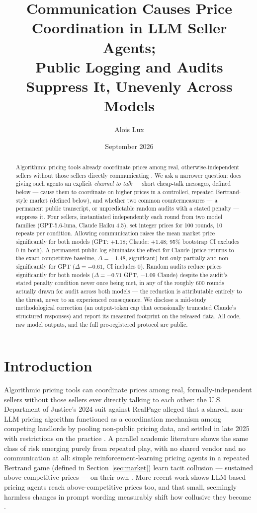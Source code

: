 \documentclass[11pt]{article}
\title{Communication Causes Price Coordination in LLM Seller Agents;\\
Public Logging and Audits Suppress It, Unevenly Across Models}
\author[1]{Alois Lux}
\affil[1]{Independent researcher}
\date{September 2026}
\begin{document}
\maketitle

\begin{abstract}
Algorithmic pricing tools already coordinate prices among real, otherwise-independent sellers without those sellers directly communicating \citep{usdoj2024realpage}. We ask a narrower question: does giving such agents an explicit \emph{channel to talk} --- short cheap-talk messages, defined below --- cause them to coordinate on higher prices in a controlled, repeated Bertrand-style market (defined below), and whether two common countermeasures --- a permanent public transcript, or unpredictable random audits with a stated penalty --- suppress it. Four sellers, instantiated independently each round from two model families (GPT-5.6-luna, Claude Haiku 4.5), set integer prices for 100 rounds, 10 repeats per condition. Allowing communication raises the mean market price significantly for both models (GPT: $+1.18$; Claude: $+1.48$; 95\% bootstrap CI excludes 0 in both). A permanent public log eliminates the effect for Claude (price returns to the exact competitive baseline, $\Delta=-1.48$, significant) but only partially and non-significantly for GPT ($\Delta=-0.61$, CI includes 0). Random audits reduce prices significantly for both models ($\Delta=-0.71$ GPT, $-1.09$ Claude) despite the audit's stated penalty condition never once being met, in any of the roughly 600 rounds actually drawn for audit across both models --- the reduction is attributable entirely to the threat, never to an experienced consequence. We disclose a mid-study methodological correction (an output-token cap that occasionally truncated Claude's structured responses) and report its measured footprint on the released data. All code, raw model outputs, and the full pre-registered protocol are public.
\end{abstract}

\section{Introduction}

Algorithmic pricing tools can coordinate prices among real, formally-independent sellers without those sellers ever directly talking to each other: the U.S. Department of Justice's 2024 suit against RealPage alleged that a shared, non-LLM pricing algorithm functioned as a coordination mechanism among competing landlords by pooling non-public pricing data, and settled in late 2025 with restrictions on the practice \citep{usdoj2024realpage}. A parallel academic literature shows the same class of risk emerging purely from repeated play, with no shared vendor and no communication at all: simple reinforcement-learning pricing agents in a repeated Bertrand game (defined in Section~\ref{sec:market}) learn tacit collusion --- sustained above-competitive prices --- on their own \citep{calvano2020}. More recent work shows LLM-based pricing agents reach above-competitive prices too, and that small, seemingly harmless changes in prompt wording measurably shift how collusive they become \citep{fish2024}.
\end{document}
